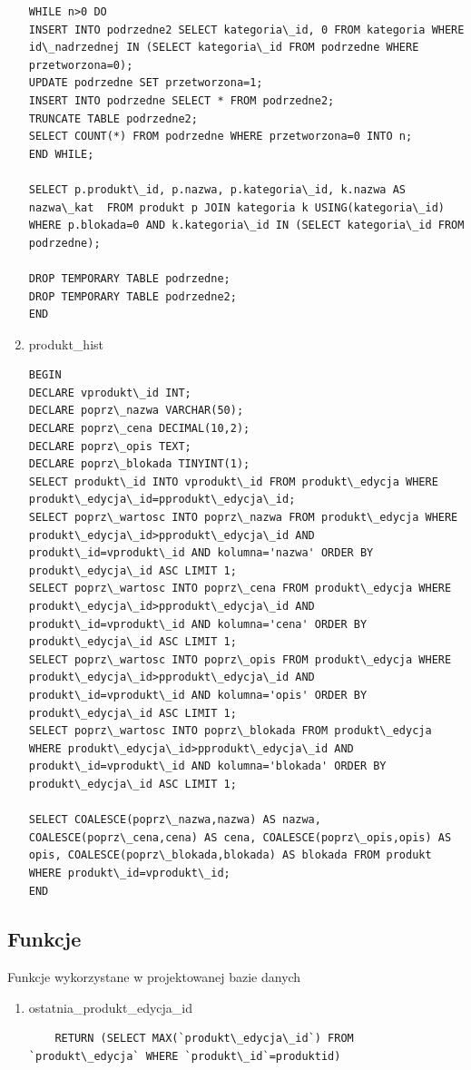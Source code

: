 \begin{enumerate}
\begin{verbatim}
WHILE n>0 DO
INSERT INTO podrzedne2 SELECT kategoria\_id, 0 FROM kategoria WHERE id\_nadrzednej IN (SELECT kategoria\_id FROM podrzedne WHERE przetworzona=0);
UPDATE podrzedne SET przetworzona=1;
INSERT INTO podrzedne SELECT * FROM podrzedne2;
TRUNCATE TABLE podrzedne2;
SELECT COUNT(*) FROM podrzedne WHERE przetworzona=0 INTO n;
END WHILE;

SELECT p.produkt\_id, p.nazwa, p.kategoria\_id, k.nazwa AS nazwa\_kat  FROM produkt p JOIN kategoria k USING(kategoria\_id) WHERE p.blokada=0 AND k.kategoria\_id IN (SELECT kategoria\_id FROM podrzedne);

DROP TEMPORARY TABLE podrzedne;
DROP TEMPORARY TABLE podrzedne2;
END
\end{verbatim}
\item produkt\_hist
\begin{verbatim}
BEGIN
DECLARE vprodukt\_id INT;
DECLARE poprz\_nazwa VARCHAR(50);
DECLARE poprz\_cena DECIMAL(10,2);
DECLARE poprz\_opis TEXT;
DECLARE poprz\_blokada TINYINT(1);
SELECT produkt\_id INTO vprodukt\_id FROM produkt\_edycja WHERE produkt\_edycja\_id=pprodukt\_edycja\_id;
SELECT poprz\_wartosc INTO poprz\_nazwa FROM produkt\_edycja WHERE produkt\_edycja\_id>pprodukt\_edycja\_id AND produkt\_id=vprodukt\_id AND kolumna='nazwa' ORDER BY produkt\_edycja\_id ASC LIMIT 1;
SELECT poprz\_wartosc INTO poprz\_cena FROM produkt\_edycja WHERE produkt\_edycja\_id>pprodukt\_edycja\_id AND produkt\_id=vprodukt\_id AND kolumna='cena' ORDER BY produkt\_edycja\_id ASC LIMIT 1;
SELECT poprz\_wartosc INTO poprz\_opis FROM produkt\_edycja WHERE produkt\_edycja\_id>pprodukt\_edycja\_id AND produkt\_id=vprodukt\_id AND kolumna='opis' ORDER BY produkt\_edycja\_id ASC LIMIT 1;
SELECT poprz\_wartosc INTO poprz\_blokada FROM produkt\_edycja WHERE produkt\_edycja\_id>pprodukt\_edycja\_id AND produkt\_id=vprodukt\_id AND kolumna='blokada' ORDER BY produkt\_edycja\_id ASC LIMIT 1;

SELECT COALESCE(poprz\_nazwa,nazwa) AS nazwa, COALESCE(poprz\_cena,cena) AS cena, COALESCE(poprz\_opis,opis) AS opis, COALESCE(poprz\_blokada,blokada) AS blokada FROM produkt WHERE produkt\_id=vprodukt\_id; 
END
\end{verbatim}
\end{enumerate}
\subsection{Funkcje}
Funkcje wykorzystane w projektowanej bazie danych

\begin{enumerate}
	\item ostatnia\_produkt\_edycja\_id
	\begin{verbatim}
	RETURN (SELECT MAX(`produkt\_edycja\_id`) FROM `produkt\_edycja` WHERE `produkt\_id`=produktid)
	\end{verbatim}
\end{enumerate}
